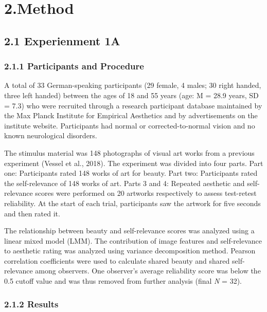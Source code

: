 \documentclass[
  man]{apa6}
\begin{document}
\hypertarget{method}{%
\section{2.Method}\label{method}}

\hypertarget{experienment-1a}{%
\subsection{2.1 Experienment 1A}\label{experienment-1a}}

\hypertarget{participants-and-procedure}{%
\subsubsection{2.1.1 Participants and Procedure}\label{participants-and-procedure}}

A total of 33 German-speaking participants (29 female, 4 males; 30 right handed, three left handed) between the ages of 18 and 55 years (age: M = 28.9 years, SD = 7.3) who were recruited through a research participant database maintained by the Max Planck Institute for Empirical Aesthetics and by advertisements on the institute website. Participants had normal or corrected-to-normal vision and no known neurological disorders.

The stimulus material was 148 photographs of visual art works from a previous experiment (Vessel et al., 2018). The experiment was divided into four parts. Part one: Participants rated 148 works of art for beauty. Part two: Participants rated the self-relevance of 148 works of art. Parts 3 and 4: Repeated aesthetic and self-relevance scores were performed on 20 artworks respectively to assess test-retest reliability. At the start of each trial, participants saw the artwork for five seconds and then rated it.

The relationship between beauty and self-relevance scores was analyzed using a linear mixed model (LMM). The contribution of image features and self-relevance to aesthetic rating was analyzed using variance decomposition method. Pearson correlation coefficients were used to calculate shared beauty and shared self-relevance among observers. One observer's average reliability score was below the 0.5 cutoff value and was thus removed from further analysis (final \emph{N} = 32).

\hypertarget{results}{%
\subsubsection{2.1.2 Results}\label{results}}
\end{document}
